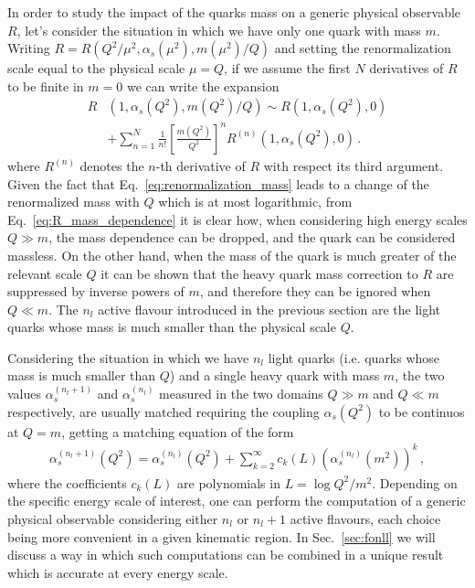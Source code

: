 %
In order to study the impact of the quarks mass on a generic physical observable $R$, let's consider
the situation in which we have only one quark with mass $m$.
Writing $R = R\left(Q^2/\mu^2, \alpha_s\left(\mu^2\right),m\left(\mu^2\right)/Q \right)$ 
and setting the renormalization scale equal to the physical scale $\mu=Q$,
if we assume the first $N$ derivatives of $R$ to be finite in $m=0$ 
we can write the expansion
\begin{align}
    \label{eq:R_mass_dependence}
    R&\left(1, \alpha_s\left(Q^2\right),m\left(Q^2\right)/Q \right) \sim
    R\left(1, \alpha_s\left(Q^2\right),0 \right)\nonumber \\
    & + \sum_{n=1}^{N}\frac{1}{n!}\left[\frac{m\left(Q^2\right)}{Q^2}\right]^n R^{(n)}\left(1,\alpha_s\left(Q^2\right),0\right)\,.
\end{align}
where $R^{(n)}$ denotes the $n$-th derivative of $R$ with respect its third argument. 
Given the fact that Eq.~\eqref{eq:renormalization_mass} leads to a change of the renormalized mass with $Q$ 
which is at most logarithmic, from Eq.~\eqref{eq:R_mass_dependence} it is clear how, when considering 
high energy scales $Q \gg m$, the mass dependence can be dropped, and the quark can be considered massless.
%
On the other hand, when the mass of the quark is much greater of the relevant scale $Q$ it can be shown 
that the heavy quark mass correction to $R$ are suppressed by inverse powers of $m$, and therefore they can be ignored when
$Q \ll m$. 
%
The $n_l$ active flavour introduced in the previous section are the light quarks whose mass is much smaller than
the physical scale $Q$.

%
Considering the situation in which we have $n_l$ light quarks (i.e. quarks whose mass is much smaller than $Q$)
and a single heavy quark with mass $m$, the two values $\alpha_s^{(n_l+1)}$ and $\alpha_s^{(n_l)}$ 
measured in the two domains $Q \gg m$ and $Q \ll m$ respectively,
are usually matched requiring  the coupling $\alpha_s\left(Q^2\right)$
to be continuos at $Q=m$, getting a matching equation of the form
\begin{align}
    \alpha_s^{(n_l+1)}\left(Q^2\right) = 
    \alpha_s^{(n_l)}\left(Q^2\right) 
    + \sum_{k=2}^{\infty} c_k\left(L\right) \left(\alpha_s^{(n_l)}\left(m^2\right)\right)^k\,,
\end{align}
where the coefficients $c_k\left(L\right)$ are  polynomials in $L=\log Q^2/m^2$.
Depending on the specific energy scale of interest,
one can perform the computation of a generic physical observable considering either $n_l$ or $n_l + 1$ active flavours,
each choice being more convenient in a given kinematic region. 
In Sec.~\ref{sec:fonll} we will discuss a way in which such computations can be combined in a unique result which
is accurate at every energy scale.

